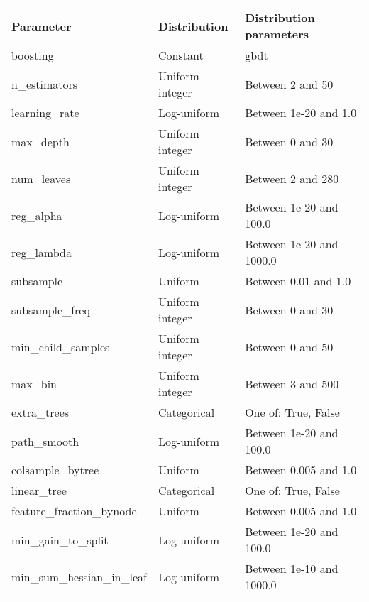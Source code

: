 \begin{tabular}{lll}
\toprule
              Parameter &    Distribution &  Distribution parameters \\
\midrule
               boosting &        Constant &                     gbdt \\
           n\_estimators & Uniform integer &         Between 2 and 50 \\
          learning\_rate &     Log-uniform &    Between 1e-20 and 1.0 \\
              max\_depth & Uniform integer &         Between 0 and 30 \\
             num\_leaves & Uniform integer &        Between 2 and 280 \\
              reg\_alpha &     Log-uniform &  Between 1e-20 and 100.0 \\
             reg\_lambda &     Log-uniform & Between 1e-20 and 1000.0 \\
              subsample &         Uniform &     Between 0.01 and 1.0 \\
         subsample\_freq & Uniform integer &         Between 0 and 30 \\
      min\_child\_samples & Uniform integer &         Between 0 and 50 \\
                max\_bin & Uniform integer &        Between 3 and 500 \\
            extra\_trees &     Categorical &      One of: True, False \\
            path\_smooth &     Log-uniform &  Between 1e-20 and 100.0 \\
       colsample\_bytree &         Uniform &    Between 0.005 and 1.0 \\
            linear\_tree &     Categorical &      One of: True, False \\
feature\_fraction\_bynode &         Uniform &    Between 0.005 and 1.0 \\
      min\_gain\_to\_split &     Log-uniform &  Between 1e-20 and 100.0 \\
min\_sum\_hessian\_in\_leaf &     Log-uniform & Between 1e-10 and 1000.0 \\
\bottomrule
\end{tabular}
